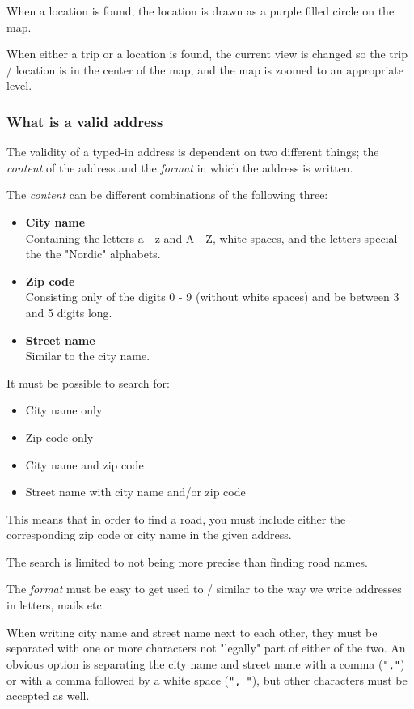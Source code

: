 When a location is found, the location is drawn as a purple filled circle on the map.

When either a trip or a location is found, the current view is changed so the trip / location is in the center of the map, and the map is zoomed to an appropriate level.

\subsubsection{What is a valid address}
\label{sec:What is a valid address}
The validity of a typed-in address is dependent on two different things; the \textit{content} of the address and the \textit{format} in which the address is written.

The \textit{content} can be different combinations of the following three:
\begin{itemize}
	\item \textbf{City name} \\
		Containing the letters a - z and A - Z, white spaces, and the letters special the the "Nordic" alphabets.
	\item \textbf{Zip code} \\
		Consisting only of the digits 0 - 9 (without white spaces) and be between 3 and 5 digits long.
	\item \textbf{Street name} \\
		Similar to the city name.
\end{itemize}
It must be possible to search for:
\begin{itemize}
	\item City name only
	\item Zip code only
	\item City name and zip code
	\item Street name with city name and/or zip code
\end{itemize}
This means that in order to find a road, you must include either the corresponding zip code or city name in the given address.

The search is limited to not being more precise than finding road names.

The \textit{format} must be easy to get used to / similar to the way we write addresses in letters, mails etc.

When writing city name and street name next to each other, they must be separated with one or more characters not "legally" part of either of the two. An obvious option is separating the city name and street name with a comma (\texttt{","}) or with a comma followed by a white space (\texttt{", "}), but other characters must be accepted as well.

